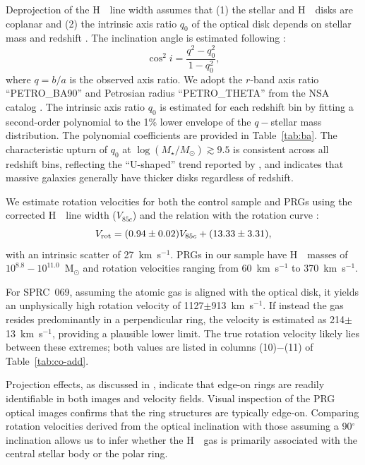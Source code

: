 \documentclass[twocolumn]{aastex631}
\newcommand{\kms}{km~s$^{-1}$}
\def\HI{H\,  {\textsc{\romannumeral 1}}}
\begin{document}
Deprojection of the \HI\ line width assumes that (1) the stellar and \HI\ disks are coplanar and (2) the intrinsic axis ratio $q_0$ of the optical disk depends on stellar mass \citep{Sanchez-Janssen2010MNRAS.406L..65S} and redshift \citep{Chang2013ApJ...773..149C}. The inclination angle is estimated following \citet{Hubble1926ApJ....64..321H}:
\begin{equation}
\cos^2 i = \frac{q^2 - q_0^2}{1 - q_0^2},  
\end{equation}
where $q = b/a$ is the observed axis ratio. We adopt the      $r$-band axis ratio ``PETRO\_BA90'' and Petrosian radius ``PETRO\_THETA'' from the NSA catalog \citep{Blanton2011AJ....142...31B}. The intrinsic axis ratio $q_0$ is estimated for each redshift bin by fitting a second-order polynomial to the 1\% lower envelope of the $q-$stellar mass distribution. The polynomial coefficients are provided in Table~\ref{tab:ba}. The characteristic upturn of $q_0$ at $\log(M_\star/M_\odot) \gtrsim 9.5$ is consistent across all redshift bins, reflecting the ``U-shaped'' trend reported by \citet{Sanchez-Janssen2010MNRAS.406L..65S}, and indicates that massive galaxies generally have thicker disks regardless of redshift.

We estimate rotation velocities for both the control sample and PRGs using the corrected \HI\ line width ($V_{85c}$) and the relation with the rotation curve \citep{Yu2020ApJ...898..102Y}:
\begin{equation}
V_{\rm rot} = (0.94 \pm 0.02) V_{85c} + (13.33 \pm 3.31), 
\end{equation}
with an intrinsic scatter of 27~\kms. PRGs in our sample have \HI\ masses of $10^{8.8}-10^{11.0}$~M$_\odot$ and rotation velocities ranging from 60~km~s$^{-1}$ to 370~km~s$^{-1}$.

For SPRC~069, assuming the atomic gas is aligned with the optical disk, it yields an unphysically high rotation velocity of 1127$\pm$913~km~s$^{-1}$. If instead the gas resides predominantly in a perpendicular ring, the velocity is estimated as 214$\pm$13~km~s$^{-1}$, providing a plausible lower limit. The true rotation velocity likely lies between these extremes; both values are listed in columns (10)$-$(11) of Table~\ref{tab:co-add}.

Projection effects, as discussed in \citet{Deg2023MNRAS.525.4663D}, indicate that edge-on rings are readily identifiable in both images and velocity fields. Visual inspection of the PRG optical images confirms that the ring structures are typically edge-on. Comparing rotation velocities derived from the optical inclination with those assuming a 90$^\circ$ inclination allows us to infer whether the \HI\ gas is primarily associated with the central stellar body or the polar ring.
\end{document}
